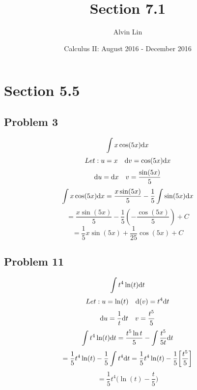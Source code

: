 \documentclass[letterpaper, 12pt]{math}
\title{Section 7.1}
\author{Alvin Lin}
\date{Calculus II: August 2016 - December 2016}
\begin{document}
\maketitle

\section*{Section 5.5}

\subsection*{Problem 3}
\[ \int{x\cos(5x)\mathrm{d}{x}} \]
\[ Let: u = x\quad \mathrm{d}{v} = \cos(5x)\mathrm{d}{x} \]
\[ \mathrm{d}{u} = \mathrm{d}{x}\quad v = \frac{\sin(5x)}{5} \]
\[ \int{x\cos(5x)\mathrm{d}{x}} =
   \frac{x\sin(5x)}{5}-\frac{1}{5}\int{\sin(5x)\mathrm{d}{x}} \]
\[ = \frac{x\sin(5x)}{5}-\frac{1}{5}(-\frac{\cos(5x)}{5})+C \]
\[ = \frac{1}{5}x\sin(5x)+\frac{1}{25}\cos(5x)+C \]

\subsection*{Problem 11}
\[ \int{t^{4}\ln(t)\mathrm{d}{t}} \]
\[ Let: u = \ln(t) \quad \mathrm{d}(v) = t^{4}\mathrm{d}{t} \]
\[ \mathrm{d}{u} = \frac{1}{t}\mathrm{d}{t} \quad v = \frac{t^{5}}{5} \]
\[ \int{t^{4}\ln(t)\mathrm{d}{t}} =
   \frac{t^{5}\ln{t}}{5}-\int{\frac{t^{5}}{5t}\mathrm{d}{t}} \]
\[ = \frac{1}{5}t^{4}\ln(t)-\frac{1}{5}\int{t^{4}}\mathrm{d}{t}
   = \frac{1}{5}t^{4}\ln(t)-\frac{1}{5}\bigg[\frac{t^{5}}{5}\bigg] \]
\[ = \frac{1}{5}t^{4}\bigg(\ln(t)-\frac{t}{5}\bigg) \]
\end{document}
